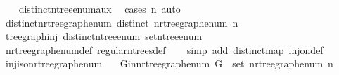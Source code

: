 \begin{isabellebody}
%
\isadelimproof
\ \ %
\endisadelimproof
%
\isatagproof
{}\isamarkupfalse%
\ distinct{\isacharunderscore}{\kern0pt}n{\isacharunderscore}{\kern0pt}tree{\isacharunderscore}{\kern0pt}enum{\isacharunderscore}{\kern0pt}aux\ \isamarkupfalse%
\ {\isacharparenleft}{\kern0pt}cases\ n{\isacharparenright}{\kern0pt}\ auto%
\endisatagproof
{\isafoldproof}%
%
\isadelimproof
\isanewline
%
\endisadelimproof
\isanewline
{}\isamarkupfalse%
\ distinct{\isacharunderscore}{\kern0pt}n{\isacharunderscore}{\kern0pt}rtree{\isacharunderscore}{\kern0pt}graph{\isacharunderscore}{\kern0pt}enum{\isacharcolon}{\kern0pt}\ {\isachardoublequoteopen}distinct\ {\isacharparenleft}{\kern0pt}n{\isacharunderscore}{\kern0pt}rtree{\isacharunderscore}{\kern0pt}graph{\isacharunderscore}{\kern0pt}enum\ n{\isacharparenright}{\kern0pt}{\isachardoublequoteclose}\isanewline
%
\isadelimproof
\ \ %
\endisadelimproof
%
\isatagproof
{}\isamarkupfalse%
\ tree{\isacharunderscore}{\kern0pt}graph{\isacharunderscore}{\kern0pt}inj\ distinct{\isacharunderscore}{\kern0pt}n{\isacharunderscore}{\kern0pt}tree{\isacharunderscore}{\kern0pt}enum\ set{\isacharunderscore}{\kern0pt}n{\isacharunderscore}{\kern0pt}tree{\isacharunderscore}{\kern0pt}enum\ \isamarkupfalse%
\ n{\isacharunderscore}{\kern0pt}rtree{\isacharunderscore}{\kern0pt}graph{\isacharunderscore}{\kern0pt}enum{\isacharunderscore}{\kern0pt}def\ regular{\isacharunderscore}{\kern0pt}n{\isacharunderscore}{\kern0pt}trees{\isacharunderscore}{\kern0pt}def\isanewline
\ \ \isamarkupfalse%
\ {\isacharparenleft}{\kern0pt}simp\ add{\isacharcolon}{\kern0pt}\ distinct{\isacharunderscore}{\kern0pt}map\ inj{\isacharunderscore}{\kern0pt}on{\isacharunderscore}{\kern0pt}def{\isacharparenright}{\kern0pt}%
\endisatagproof
{\isafoldproof}%
%
\isadelimproof
\isanewline
%
\endisadelimproof
\isanewline
{}\isamarkupfalse%
\ inj{\isacharunderscore}{\kern0pt}iso{\isacharunderscore}{\kern0pt}n{\isacharunderscore}{\kern0pt}rtree{\isacharunderscore}{\kern0pt}graph{\isacharunderscore}{\kern0pt}enum{\isacharcolon}{\kern0pt}\isanewline
\ \ \ G{\isacharunderscore}{\kern0pt}in{\isacharunderscore}{\kern0pt}n{\isacharunderscore}{\kern0pt}rtree{\isacharunderscore}{\kern0pt}graph{\isacharunderscore}{\kern0pt}enum{\isacharcolon}{\kern0pt}\ {\isachardoublequoteopen}G\ {\isasymin}\ set\ {\isacharparenleft}{\kern0pt}n{\isacharunderscore}{\kern0pt}rtree{\isacharunderscore}{\kern0pt}graph{\isacharunderscore}{\kern0pt}enum\ n{\isacharparenright}{\kern0pt}{\isachardoublequoteclose}\isanewline

\end{isabellebody}
